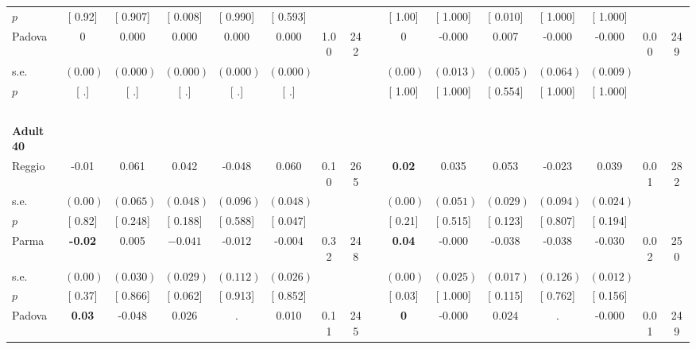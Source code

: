 \begin{longtable}{L{8em} c c c c c c c p{1em} c c c c c c c}
\quad \quad \quad \quad $ p$ & [     0.92] & [    0.907] & [    0.008] & [    0.990] & [    0.593] & & & & [     1.00] & [    1.000] & [    0.010] & [    1.000] & [    1.000] & &  \\[1em]
\quad \quad \quad Padova& 0 &     0.000 &     0.000 &     0.000 &     0.000 &      1.00 &       242 & & 0 &    -0.000 &     0.007 &    -0.000 &    -0.000 &      0.00 &       249  \\*
\quad \quad \quad \quad s.e.& $ (     0.00)$ & $ (    0.000)$ & $ (    0.000)$ & $ (    0.000)$ & $ (    0.000)$ & & & & $ (     0.00)$ & $ (    0.013)$ & $ (    0.005)$ & $ (    0.064)$ & $ (    0.009)$ & &  \\*
\quad \quad \quad \quad $ p$ & [        .] & [        .] & [        .] & [        .] & [        .] & & & & [     1.00] & [    1.000] & [    0.554] & [    1.000] & [    1.000] & &  \\[1em]
~\\[1em]
\quad \quad \textbf{Adult 40} & & & & & & & & & & & & & & & \\* 
\quad \quad \quad Reggio& -0.01 &     0.061 &     0.042 &    -0.048 & $ \mathbf{    0.060}$ &      0.10 &       265 & & \textbf{     0.02} &     0.035 &     0.053 &    -0.023 &     0.039 &      0.01 &       282  \\*
\quad \quad \quad \quad s.e.& $ (     0.00)$ & $ (    0.065)$ & $ (    0.048)$ & $ (    0.096)$ & $ (    0.048)$ & & & & $ (     0.00)$ & $ (    0.051)$ & $ (    0.029)$ & $ (    0.094)$ & $ (    0.024)$ & &  \\*
\quad \quad \quad \quad $ p$ & [     0.82] & [    0.248] & [    0.188] & [    0.588] & [    0.047] & & & & [     0.21] & [    0.515] & [    0.123] & [    0.807] & [    0.194] & &  \\[1em]
\quad \quad \quad Parma& \textbf{    -0.02} &     0.005 & $ \mathbf{   -0.041}$ &    -0.012 &    -0.004 &      0.32 &       248 & & \textbf{     0.04} &    -0.000 &    -0.038 &    -0.038 &    -0.030 &      0.02 &       250  \\*
\quad \quad \quad \quad s.e.& $ (     0.00)$ & $ (    0.030)$ & $ (    0.029)$ & $ (    0.112)$ & $ (    0.026)$ & & & & $ (     0.00)$ & $ (    0.025)$ & $ (    0.017)$ & $ (    0.126)$ & $ (    0.012)$ & &  \\*
\quad \quad \quad \quad $ p$ & [     0.37] & [    0.866] & [    0.062] & [    0.913] & [    0.852] & & & & [     0.03] & [    1.000] & [    0.115] & [    0.762] & [    0.156] & &  \\[1em]
\quad \quad \quad Padova& \textbf{     0.03} &    -0.048 &     0.026 &         . &     0.010 &      0.11 &       245 & & \textbf{0} &    -0.000 &     0.024 &         . &    -0.000 &      0.01 &       249  \\*

\end{longtable}

